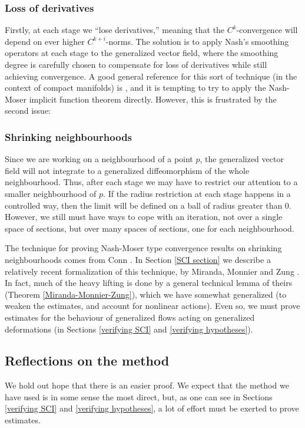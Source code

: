 \documentclass{article}
\begin{document}
\subsubsection*{Loss of derivatives}

Firstly, at each stage we ``lose derivatives,'' meaning that the $C^k$-convergence will depend on ever higher $C^{k+i}$-norms.  The solution is to apply Nash's smoothing operators at each stage to the generalized vector field, where the smoothing degree is carefully chosen to compensate for loss of derivatives while still achieving convergence.  A good general reference for this sort of technique (in the context of compact manifolds) is \cite{Hamilton}, and it is tempting to try to apply the Nash-Moser implicit function theorem directly. However, this is frustrated by the second issue:

\subsubsection*{Shrinking neighbourhoods}

Since we are working on a neighbourhood of a point $p$, the generalized vector field will not integrate to a generalized diffeomorphism of the whole neighbourhood.  Thus, after each stage we may have to restrict our attention to a smaller neighbourhood of $p$.  If the radius restriction at each stage happens in a controlled way, then the limit will be defined on a ball of radius greater than 0.  However, we still must have ways to cope with an iteration, not over a single space of sections, but over many spaces of sections, one for each neighbourhood.

The technique for proving Nash-Moser type convergence results on shrinking neighbourhoods comes from Conn \cite{Conn}.  In Section \ref{SCI section} we describe a relatively recent formalization of this technique, by Miranda, Monnier and Zung \cite{MirandaMonnierZung} \cite{MonnierZung}.  In fact, much of the heavy lifting is done by a general technical lemma of theirs (Theorem \ref{Miranda-Monnier-Zung}), which we have somewhat generalized (to weaken the estimates, and account for nonlinear actions).  Even so, we must prove estimates for the behaviour of generalized flows acting on generalized deformations (in Sections \ref{verifying SCI} and \ref{verifying hypotheses}).

\subsection*{Reflections on the method}
We hold out hope that there is an easier proof.  We expect that the method we have used is in some sense the most direct, but, as one can see in Sections \ref{verifying SCI} and \ref{verifying hypotheses}, a lot of effort must be exerted to prove estimates.
\end{document}
